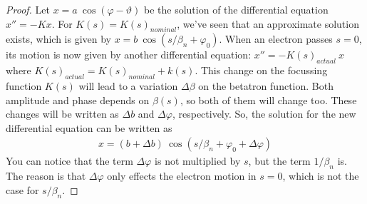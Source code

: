 \begin{proof}
	Let $x = a\ \cos(\varphi-\vartheta)$ be the solution of the differential equation $x'' = -Kx$. For $K(s) = K(s)_{nominal}$, we've seen that an approximate solution exists, which is given by $x = b\ \cos(s/\beta_n + \varphi_0)$. When an electron passes $s=0$, its motion is now given by another differential equation: $x'' = -K(s)_{actual}\ x$ where $K(s)_{actual} = K(s)_{nominal} + k(s)$. This change on the focussing function $K(s)$ will lead to a variation $\Delta \beta$ on the betatron function. Both amplitude and phase depends on $\beta(s)$, so both of them will change too. These changes will be written as $\Delta b$ and $\Delta \varphi$, respectively. So, the solution for the new differential equation can be written as
	\begin{align*}
		x = (b+\Delta b)\ \cos(s/\beta_n + \varphi_0 + \Delta \varphi)
	\end{align*}
	You can notice that the term $\Delta \varphi$ is not multiplied by $s$, but the term $1/\beta_n$ is. The reason is that $\Delta \varphi$ only effects the electron motion in $s=0$, which is not the case for $s/\beta_n$.


\end{proof}
